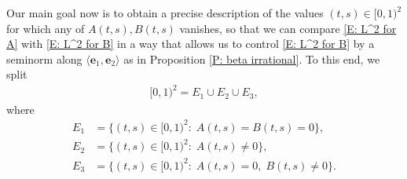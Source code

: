 \documentclass[11pt]{amsart}
\theoremstyle{definition}
\newcommand{\T}{{\mathbb T}}
\newcommand{\be}{{\mathbf{e}}}
\newcommand{\1}{{\mathbf{1}}}
\begin{document}
Our main goal now is to obtain a precise description of the values
$(t,s)\in[0,1)^2$ for which any of $A(t,s), B(t,s)$ vanishes, so that we can compare \eqref{E: L^2 for A} with \eqref{E: L^2 for B} in a way that allows us to control \eqref{E: L^2 for B} by a seminorm along $\langle \be_1, \be_2\rangle$ as in Proposition \ref{P: beta irrational}.
To this end, we split 
\begin{align*}
    [0,1)^2 = E_1 \cup E_2 \cup E_3,
\end{align*}
where 
\begin{align*}
    E_1 &= \{(t,s)\in[0,1)^2:\; A(t,s) = B(t,s) = 0\},\\
    E_2 &= \{(t,s)\in[0,1)^2:\; A(t,s) \neq 0\},\\
    E_3 &= \{(t,s)\in[0,1)^2:\; A(t,s) = 0,\; B(t,s) \neq 0\}.
\end{align*}
\end{document}
